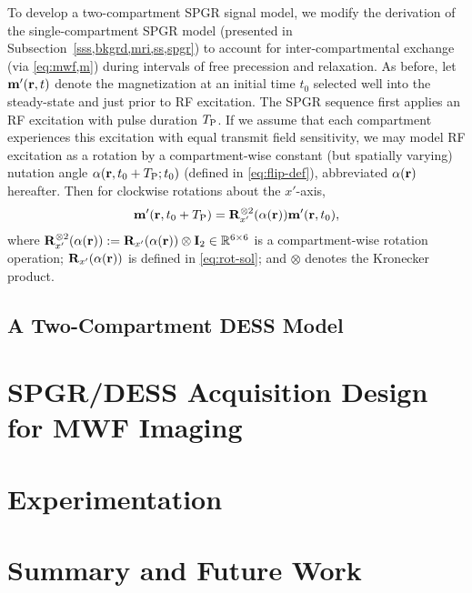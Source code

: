 To develop a two-compartment SPGR signal model,
we modify the derivation 
of the single-compartment SPGR model
(presented in Subsection~\ref{sss,bkgrd,mri,ss,spgr})
to account for inter-compartmental exchange
(via \eqref{eq:mwf,m})
during intervals of free precession and relaxation.
As before,
let $\bmmp\prt$ denote the magnetization
at an initial time $t_0$ selected 
well into the steady-state
and just prior to RF excitation.
The SPGR sequence first applies
an RF excitation
with pulse duration $T_\mathrm{P}$.
If we assume
that each compartment 
experiences this excitation
with equal transmit field sensitivity,
we may model RF excitation as a rotation
by a compartment-wise constant 
(but spatially varying)
nutation angle $\flip\prtzt{t_0+\TP}$
(defined in \eqref{eq:flip-def}),
abbreviated $\flip\pr$ hereafter.
Then for clockwise rotations
about the $x'$-axis,
\begin{align}
	\bmmp\paren{\bmr,t_0+\TP} = 
		\bmRxpsix{\flip\pr} \bmmp\prtz,
		\label{eq:mwf,spgr-ex}
\end{align}
where $\bmRxpsix{\flip\pr} := \bmRxp{\flip\pr} \otimes \eye{2} 
\in \reals{6 \times 6}$
is a compartment-wise rotation operation;
$\bmRxp{\flip\pr}$ is defined in \eqref{eq:rot-sol};
and $\otimes$ denotes the Kronecker product.

\subsection{A Two-Compartment DESS Model}
\label{ss,mwf,model,dess}


\section{SPGR/DESS Acquisition Design for MWF Imaging}
\label{s,mwf,acq}


\section{Experimentation}
\label{s,mwf,exp}


\section{Summary and Future Work}
\label{s,mwf,summ}

